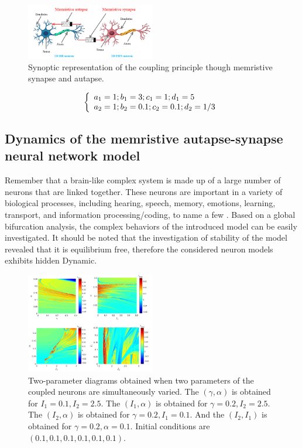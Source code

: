\documentclass[journal]{IEEEtran/IEEEtran}
\begin{document}
\begin{figure}[!t]
	\centering
	\includegraphics[width=0.5\textwidth]{fig.png}
		\caption{Synoptic representation of the coupling principle though memristive synapse and autapse.}
	\label{fig}
\end{figure}

\begin{equation}\label{eq5}
\left\{ \begin{array}{l}
 {a_1} = 1;{\rm{    }}{b_1} = 3;{\rm{   }}{c_1} = 1;{\rm{   }}{d_1} = 5 \\ 
 {a_2} = 1;{\rm{  }}{b_2} = 0.1;{\rm{ }}{c_2} = 0.1;{\rm{ }}{d_2} = 1/3 \\ 
 \end{array} \right.
\end{equation}

\subsection{Dynamics of the memristive autapse-synapse neural network model}

Remember that a brain-like complex system is made up of a large number of neurons that are linked together. These neurons are important in a variety of biological processes, including hearing, speech, memory, emotions, learning, transport, and information processing/coding, to name a few \cite{lin2021review}. Based on a global bifurcation analysis, the complex behaviors of the introduced model can be easily investigated. It should be noted that the investigation of stability of the model revealed that it is equilibrium free, therefore the considered neuron models exhibits hidden Dynamic.

\begin{figure}[!t]
	\centering
	\includegraphics[width=0.5\textwidth]{fig2.png}
		\caption{Two-parameter diagrams obtained when two parameters of the coupled neurons are simultaneously varied. The $(\gamma, \alpha)$ is obtained for $I_{1}=0.1, I_{2}=2.5$. The $\left(I_{1}, \alpha\right)$ is obtained for $\gamma=0.2, I_{2}=2.5$. The $\left(I_{2}, \alpha\right)$ is obtained for $\gamma=0.2, I_{1}=0.1$. And the $\left(I_{2}, I_{1}\right)$ is obtained for $\gamma=0.2, \alpha=0.1$. Initial conditions are $(0.1,0.1,0.1,0.1,0.1,0.1)$.}
	\label{fig2}
\end{figure}
\end{document}
